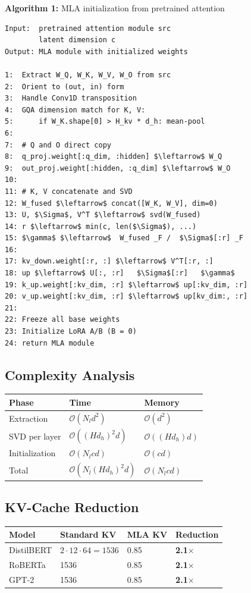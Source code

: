 \textbf{Algorithm 1:} MLA initialization from pretrained attention
\begin{lstlisting}
Input:  pretrained attention module src
        latent dimension c
Output: MLA module with initialized weights

1:  Extract W_Q, W_K, W_V, W_O from src
2:  Orient to (out, in) form
3:  Handle Conv1D transposition
4:  GQA dimension match for K, V:
5:      if W_K.shape[0] > H_kv * d_h: mean-pool
6:
7:  # Q and O direct copy
8:  q_proj.weight[:q_dim, :hidden] $\leftarrow$ W_Q
9:  out_proj.weight[:hidden, :q_dim] $\leftarrow$ W_O
10:
11: # K, V concatenate and SVD
12: W_fused $\leftarrow$ concat([W_K, W_V], dim=0)
13: U, $\Sigma$, V^T $\leftarrow$ svd(W_fused)
14: r $\leftarrow$ min(c, len($\Sigma$), ...)
15: $\gamma$ $\leftarrow$  W_fused _F /  $\Sigma$[:r] _F
16:
17: kv_down.weight[:r, :] $\leftarrow$ V^T[:r, :]
18: up $\leftarrow$ U[:, :r]   $\Sigma$[:r]   $\gamma$
19: k_up.weight[:kv_dim, :r] $\leftarrow$ up[:kv_dim, :r]
20: v_up.weight[:kv_dim, :r] $\leftarrow$ up[kv_dim:, :r]
21:
22: Freeze all base weights
23: Initialize LoRA A/B (B = 0)
24: return MLA module
\end{lstlisting}

\subsection{Complexity Analysis}

\begin{table}[H]
\centering
\small
\begin{tabular}{lll}
\toprule
\textbf{Phase} & \textbf{Time} & \textbf{Memory} \\
\midrule
Extraction & $\mathcal{O}(N_l d^2)$ & $\mathcal{O}(d^2)$ \\
SVD per layer & $\mathcal{O}((H d_h)^2 d)$ & $\mathcal{O}((H d_h) d)$ \\
Initialization & $\mathcal{O}(N_l c d)$ & $\mathcal{O}(c d)$ \\
Total & $\mathcal{O}(N_l (H d_h)^2 d)$ & $\mathcal{O}(N_l c d)$ \\
\bottomrule
\end{tabular}
\end{table}

\subsection{KV-Cache Reduction}

\begin{table}[H]
\centering
\small
\begin{tabular}{llll}
\toprule
\textbf{Model} & \textbf{Standard KV} & \textbf{MLA KV} & \textbf{Reduction} \\
\midrule
DistilBERT & $2 \cdot 12 \cdot 64 = 1536$ & 0.85 & \textbf{2.1$\times$} \\
RoBERTa & 1536 & 0.85 & \textbf{2.1$\times$} \\
GPT-2 & 1536 & 0.85 & \textbf{2.1$\times$} \\
\bottomrule
\end{tabular}
\end{table}

